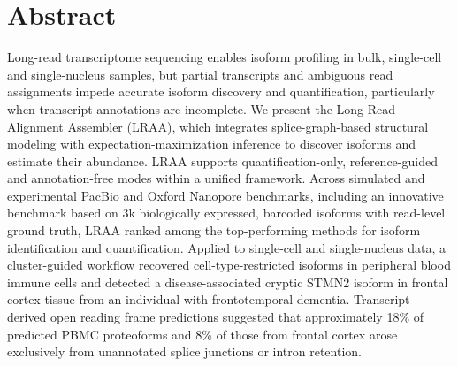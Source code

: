 \section*{Abstract}
Long-read transcriptome sequencing enables isoform profiling in bulk, single-cell and single-nucleus samples, but partial transcripts and ambiguous read assignments impede accurate isoform discovery and quantification, particularly when transcript annotations are incomplete. We present the Long Read Alignment Assembler (LRAA), which integrates splice-graph-based structural modeling with expectation-maximization inference to discover isoforms and estimate their abundance. LRAA supports quantification-only, reference-guided and annotation-free modes within a unified framework. Across simulated and experimental PacBio and Oxford Nanopore benchmarks, including an innovative benchmark based on 3k biologically expressed, barcoded isoforms with read-level ground truth, LRAA ranked among the top-performing methods for isoform identification and quantification. Applied to single-cell and single-nucleus data, a cluster-guided workflow recovered cell-type-restricted isoforms in peripheral blood immune cells and detected a disease-associated cryptic STMN2 isoform in frontal cortex tissue from an individual with frontotemporal dementia. Transcript-derived open reading frame predictions suggested that approximately 18\% of predicted PBMC proteoforms and 8\% of those from frontal cortex arose exclusively from unannotated splice junctions or intron retention.
